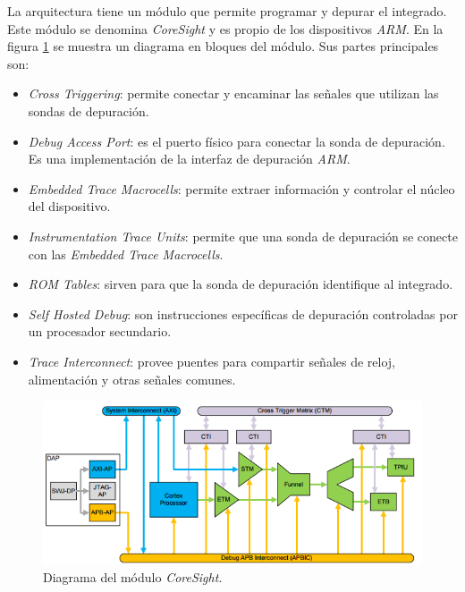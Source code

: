La arquitectura tiene un módulo que permite programar y depurar el integrado.
Este módulo se denomina \emph{CoreSight} y es propio de los dispositivos \emph{ARM}.
En la figura \ref{fig:coresight} se muestra un diagrama en bloques del módulo.
Sus partes principales son:

\begin{itemize}
    \item \emph{Cross Triggering}: permite conectar y encaminar las señales que utilizan las sondas de depuración.  
    \item \emph{Debug Access Port}: es el puerto físico para conectar la sonda de depuración. Es una implementación de la interfaz de depuración \emph{ARM}.
    \item \emph{Embedded Trace Macrocells}: permite extraer información y controlar el núcleo del dispositivo.
    \item \emph{Instrumentation Trace Units}: permite que una sonda de depuración se conecte con las \emph{Embedded Trace Macrocells}.
    \item \emph{ROM Tables}: sirven para que la sonda de depuración identifique al integrado.
    \item \emph{Self Hosted Debug}: son instrucciones específicas de depuración controladas por un procesador secundario.
    \item \emph{Trace Interconnect}: provee puentes para compartir señales de reloj, alimentación y otras señales comunes.
\end{itemize}

\begin{figure}[htbp]
	\centering
	\includegraphics[width=\textwidth]{./Figures/coresight.png}
    \caption{Diagrama del módulo \emph{CoreSight}\protect\footnotemark.}
	\label{fig:coresight}
\end{figure}

